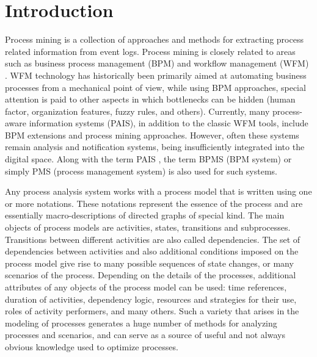 \documentclass[
11pt,%
tightenlines,%
twoside,%
onecolumn,%
nofloats,%
nobibnotes,%
nofootinbib,%
superscriptaddress,%
noshowpacs,%
centertags]%
{revtex4}
\begin{document}
\maketitle

\section{Introduction}

Process mining \cite{Aalst} is a collection of approaches and methods for extracting process related information from event logs.
Process mining is closely related to areas such as business process management (BPM) \cite{BPM} and workflow management (WFM) \cite{WFM}.
WFM technology has historically been primarily aimed at automating business processes from a mechanical point of view, while using BPM approaches, special attention is paid to other aspects in which bottlenecks can be hidden (human factor, organization features, fuzzy rules, and others).
Currently, many process-aware information systems (PAIS), in addition to the classic WFM tools, include BPM extensions and process mining approaches.
However, often these systems remain analysis and notification systems, being insufficiently integrated into the digital space.
Along with the term PAIS \cite{PAIS}, the term BPMS (BPM system) or simply PMS (process management system) is also used for such systems.

Any process analysis system works with a process model that is written using one or more notations.
These notations represent the essence of the process and are essentially macro-descriptions of directed graphs of special kind.
The main objects of process models are activities, states, transitions and subprocesses.
Transitions between different activities are also called dependencies.
The set of dependencies between activities and also additional conditions imposed on the process model give rise to many possible sequences of state changes, or many scenarios of the process.
Depending on the details of the processes, additional attributes of any objects of the process model can be used: time references, duration of activities, dependency logic, resources and strategies for their use, roles of activity performers, and many others.
Such a variety that arises in the modeling of processes generates a huge number of methods for analyzing processes and scenarios, and can serve as a source of useful and not always obvious knowledge used to optimize processes.
\end{document}
